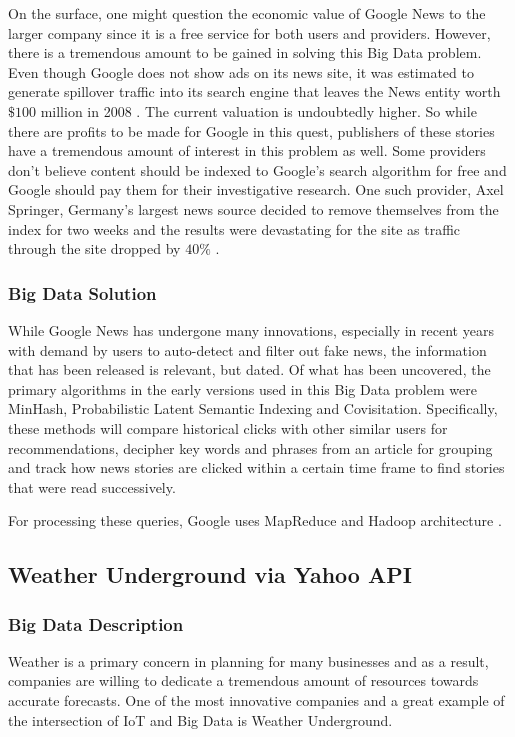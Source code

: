 \documentclass[sigconf]{acmart}
\begin{document}
On the surface, one might question the economic value of Google News to the larger company since it is a free service for both users and providers. However, there is a tremendous amount to be gained in solving this Big Data problem. Even though Google does not show ads on its news site, it was estimated to generate spillover traffic into its search engine that leaves the News entity worth $\$100$ million in 2008 \cite{newsvalue}. The current valuation is undoubtedly higher. So while there are profits to be made for Google in this quest, publishers of these stories have a tremendous amount of interest in this problem as well. Some providers don't believe content should be indexed to Google's search algorithm for free and Google should pay them for their investigative research. One such provider, Axel Springer, Germany's largest news source decided to remove themselves from the index for two weeks and the results were devastating for the site as traffic through the site dropped by $40\%$ \cite{springer}.

\subsubsection{Big Data Solution}
While Google News has undergone many innovations, especially in recent years with demand by users to auto-detect and filter out fake news, the information that has been released is relevant, but dated. Of what has been uncovered, the primary algorithms in the early versions used in this Big Data problem were MinHash, Probabilistic Latent Semantic Indexing and Covisitation. Specifically, these methods will compare historical clicks with other similar users for recommendations, decipher key words and phrases from an article for grouping and track how news stories are clicked within a certain time frame to find stories that were read successively.  

For processing these queries, Google uses MapReduce and Hadoop architecture \cite{googlearch}.  
\subsection{Weather Underground via Yahoo API}
\subsubsection{Big Data Description}
Weather is a primary concern in planning for many businesses and as a result, companies are willing to dedicate a tremendous amount of resources towards accurate forecasts. One of the most innovative companies and a great example of the intersection of IoT and Big Data is Weather Underground. 
\end{document}
